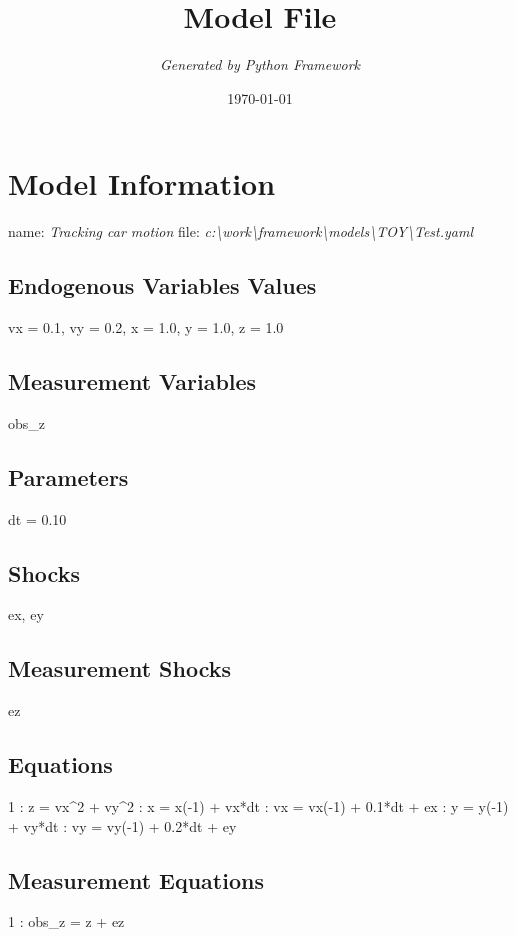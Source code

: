 \documentclass{article}%
\title{\textbf{Model File}}%
\author{\textit{Generated by Python Framework}}%
\date{\today}%
\begin{document}
%
\normalsize%
\maketitle%
\section{Model Information}%
\label{sec:ModelInformation}%
name: %
\textit{Tracking car motion}%
\newline%
file: %
\textit{c:\textbackslash{}work\textbackslash{}framework\textbackslash{}models\textbackslash{}TOY\textbackslash{}Test.yaml}%
\subsection{Endogenous Variables Values}%
\label{subsec:EndogenousVariablesValues}%
vx = 0.1, vy = 0.2, x = 1.0, y = 1.0, z = 1.0

%
\subsection{Measurement Variables}%
\label{subsec:MeasurementVariables}%
obs\_z

%
\subsection{Parameters}%
\label{subsec:Parameters}%
dt = 0.10

%
\subsection{Shocks}%
\label{subsec:Shocks}%
ex, ey

%
\subsection{Measurement Shocks}%
\label{subsec:MeasurementShocks}%
ez

%
\subsection{Equations}%
\label{subsec:Equations}%
 1    :  z  = vx\^{}2  + vy\^{}2\newline%
    :  x  = x({-}1)  + vx*dt\newline%
    :  vx = vx({-}1) + 0.1*dt + ex\newline%
    :  y  = y({-}1)  + vy*dt\newline%
    :  vy = vy({-}1) + 0.2*dt + ey\newline%

%
\subsection{Measurement Equations}%
\label{subsec:MeasurementEquations}%
 1    :  obs\_z = z + ez\newline%

%
\end{document}
